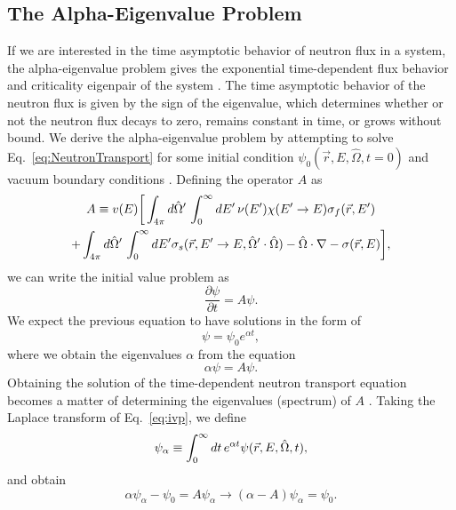 \subsection{The Alpha-Eigenvalue Problem}
If we are interested in the time asymptotic behavior of neutron flux in a system, the alpha-eigenvalue problem gives the exponential time-dependent flux behavior and criticality eigenpair of the system \cite{bell_nuclear_1970}. The time asymptotic behavior of the neutron flux is given by the sign of the eigenvalue, which determines whether or not the neutron flux decays to zero, remains constant in time, or grows without bound. We derive the alpha-eigenvalue problem by attempting to solve Eq.~\ref{eq:NeutronTransport} for some initial condition $\psi_{0}(\vec{r},E,\hat{\Omega},t=0)$ and vacuum boundary conditions \cite{lewis_computational_1984}. Defining the operator $A$ as
\begin{multline}
A \equiv v(E) \bigg [ \int_{4\pi} \mathop{}\!d \hat{\Omega}' \, \int_{0}^{\infty} \mathop{}\!d E' \, \nu(E') \chi(E'\rightarrow E) \sigma_{f}(\vec{r},E') \\ +\int_{4\pi} \mathop{}\!d \hat{\Omega}' \, \int_{0}^{\infty} \mathop{}\!d E' \sigma_{s}(\vec{r},E'\rightarrow E, \hat{\Omega}' \cdot \hat{\Omega}) - \hat{\Omega} \cdot \nabla - \sigma(\vec{r},E) \bigg ],
\end{multline}
we can write the initial value problem as 
\begin{equation}
\frac{\partial \psi}{\partial t} = A \psi.
\label{eq:ivp}
\end{equation}
We expect the previous equation to have solutions in the form of
\begin{equation}
		\psi = \psi_{0} e^{\alpha t},
\end{equation}
where we obtain the eigenvalues $\alpha$ from the equation
\begin{equation}
\alpha \psi = A \psi.
\label{eq:ivp_A}
	\end{equation}
Obtaining the solution of the time-dependent neutron transport equation becomes a matter of determining the eigenvalues (spectrum) of $A$ \cite{bell_nuclear_1970}. Taking the Laplace transform of Eq.~\ref{eq:ivp}, we define
\begin{equation}
	\psi_{\alpha} \equiv \int_{0}^{\infty} \mathop{}\!d t \, e^{\alpha t} \psi(\vec{r},E,\hat{\Omega},t), 
\end{equation}
and obtain
\begin{equation}
	\alpha \psi_{\alpha} - \psi_{0} = A \psi_{\alpha} \rightarrow (\alpha - A) \psi_{\alpha} = \psi_{0}.	\end{equation}
